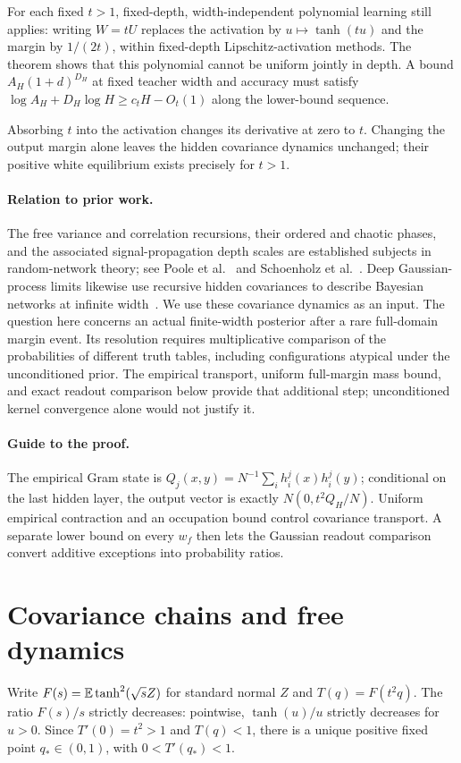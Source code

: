 \documentclass[11pt]{article}
\begin{document}
For each fixed $t>1$, fixed-depth, width-independent polynomial learning
still applies: writing $W=tU$ replaces the activation by
$u\mapsto\tanh(tu)$ and the margin by $1/(2t)$, within fixed-depth
Lipschitz-activation methods. The theorem shows that this polynomial
cannot be uniform jointly in depth. A bound $A_H(1+d)^{D_H}$ at fixed
teacher width and accuracy must satisfy
$\log A_H+D_H\log H\ge c_tH-O_t(1)$ along the lower-bound sequence.

Absorbing $t$ into the activation changes its derivative at zero to $t$.
Changing the output margin alone leaves the hidden covariance dynamics
unchanged; their positive white equilibrium exists precisely for $t>1$.

\paragraph{Relation to prior work.}
The free variance and correlation recursions, their ordered and chaotic phases, and the associated signal-propagation depth scales are established subjects in random-network theory; see Poole et al.~\cite{poole} and Schoenholz et al.~\cite{schoenholz}. Deep Gaussian-process limits likewise use recursive hidden covariances to describe Bayesian networks at infinite width~\cite{lee}. We use these covariance dynamics as an input. The question here concerns an actual finite-width posterior after a rare full-domain margin event. Its resolution requires multiplicative comparison of the probabilities of different truth tables, including configurations atypical under the unconditioned prior. The empirical transport, uniform full-margin mass bound, and exact readout comparison below provide that additional step; unconditioned kernel convergence alone would not justify it.

\paragraph{Guide to the proof.}
The empirical Gram state is
$Q_j(x,y)=N^{-1}\sum_i h_i^j(x)h_i^j(y)$; conditional on the last
hidden layer, the output vector is exactly $N(0,t^2Q_H/N)$.
Uniform empirical contraction and an occupation bound control covariance
transport. A separate lower bound on every $w_f$ then lets the Gaussian
readout comparison convert additive exceptions into probability ratios.

\section{Covariance chains and free dynamics}
Write $F(s)=\mathbb E\tanh^2(\sqrt{s}Z)$ for standard normal $Z$ and $T(q)=F(t^2q)$. The ratio $F(s)/s$ strictly decreases: pointwise, $\tanh(u)/u$ strictly decreases for $u>0$. Since $T'(0)=t^2>1$ and $T(q)<1$, there is a unique positive fixed point $q_*\in(0,1)$, with $0<T'(q_*)<1$.
\end{document}
